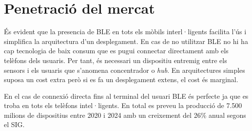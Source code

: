 \section*{Penetració del mercat}

És evident que la presencia de BLE en tots els mòbils interl·ligents facilita l'ús i simplifica la arquitectura d'un desplegament.
En cas de no utilitzar BLE no hi ha cap tecnologia de baix consum que es pugui connectar directament amb els telèfons dels usuaris.
Per tant, és necessari un dispositiu entremig entre els sensors i els usuaris que s'anomena concentrador o \textit{hub}.
En arquitectures simples suposa un cost extra però si es fa un desplegament extens, el cost és marginal.

En el cas de connexió directa fins al terminal del usuari BLE és perfecte ja que es troba en tots els telèfons intel·ligents.
En total es preveu la producció de 7.500 milions de dispositius entre 2020 i 2024 amb un creixement del 26\% anual segons el SIG\cite{Bluetooth_Market_Update_2020}.